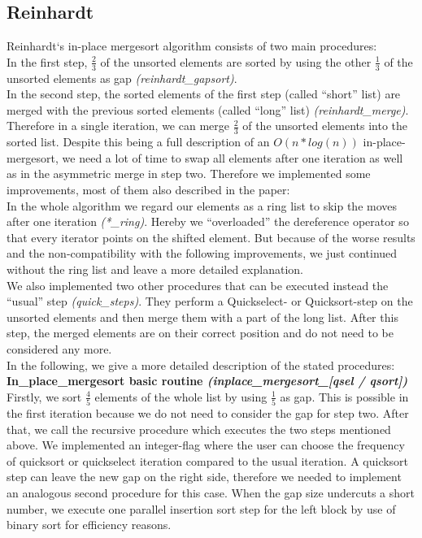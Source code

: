 \documentclass[11pt,pdftex,a4paper, twocolumn]{article}
\begin{document}
\subsection*{Reinhardt}
Reinhardt‘s in-place mergesort algorithm consists of two main procedures: \\
In the first step, $\frac{2}{3}$ of the unsorted elements are sorted by using the other $\frac{1}{3}$ of the unsorted elements as gap \textit{(reinhardt\_gapsort)}. \\
In the second step, the sorted elements of the first step (called “short” list) are merged with the previous sorted elements (called “long” list) \textit{(reinhardt\_merge)}. \\
Therefore in a single iteration, we can merge $\frac{2}{3}$ of the unsorted elements into the sorted list. Despite this being a full description of an $O(n*log(n))$ in-place-mergesort, we need a lot of time to swap all elements after one iteration as well as in the asymmetric merge in step two. Therefore we implemented some improvements, most of them also described in the paper: \\
In the whole algorithm we regard our elements as a ring list to skip the moves after one iteration \textit{(*\_ring)}. Hereby we “overloaded” the dereference operator so that every iterator points on the shifted element. But because of the worse results and the non-compatibility with the following improvements, we just continued without the ring list and leave a more detailed explanation. \\
We also implemented two other procedures that can be executed instead the “usual” step \textit{(quick\_steps)}. They perform a Quickselect- or Quicksort-step on the unsorted elements and then merge them with a part of the long list. After this step, the merged elements are on their correct position and do not need to be considered any more. \\
In the following, we give a more detailed description of the stated procedures: \\
\textbf{In\_place\_mergesort basic routine \textit{(inplace\_mergesort\_[qsel / qsort])}} \\
Firstly, we sort $\frac{4}{5}$ elements of the whole list by using $\frac{1}{5}$ as gap. This is possible in the first iteration because we do not need to consider the gap for step two. After that, we call the recursive procedure which executes the two steps mentioned above. We implemented an integer-flag where the user can choose the frequency of quicksort or quickselect iteration compared to the usual iteration. A quicksort step can leave the new gap on the right side, therefore we needed to implement an analogous second procedure for this case. When the gap size undercuts a short number, we execute one parallel insertion sort step for the left block by use of binary sort for efficiency reasons. \\
\end{document}
